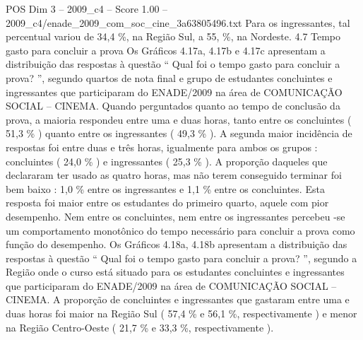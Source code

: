 \begin{textsample}{POS Dim 3 – 2009\_c4 – Score 1.00 – 2009\_c4/enade\_2009\_com\_soc\_cine\_3a63805496.txt}
Para os ingressantes, tal percentual variou de 34,4 \%, na Região Sul, a 55, \%, na Nordeste. 4.7 Tempo gasto para concluir a prova Os Gráficos 4.17a, 4.17b e 4.17c apresentam a distribuição das respostas à questão “ Qual foi o tempo gasto para concluir a prova? ”, segundo quartos de nota final e grupo de estudantes concluintes e ingressantes que participaram do ENADE/2009 na área de COMUNICAÇÃO SOCIAL – CINEMA.
Quando perguntados quanto ao tempo de conclusão da prova, a maioria respondeu entre uma e duas horas, tanto entre os concluintes ( 51,3 \% ) quanto entre os ingressantes ( 49,3 \% ).
A segunda maior incidência de respostas foi entre duas e três horas, igualmente para ambos os grupos : concluintes ( 24,0 \% ) e ingressantes ( 25,3 \% ).
A proporção daqueles que declararam ter usado as quatro horas, mas não terem conseguido terminar foi bem baixo : 1,0 \% entre os ingressantes e 1,1 \% entre os concluintes.
Esta resposta foi maior entre os estudantes do primeiro quarto, aquele com pior desempenho.
Nem entre os concluintes, nem entre os ingressantes percebeu -se um comportamento monotônico do tempo necessário para concluir a prova como função do desempenho.
Os Gráficos 4.18a, 4.18b apresentam a distribuição das respostas à questão “ Qual foi o tempo gasto para concluir a prova? ”, segundo a Região onde o curso está situado para os estudantes concluintes e ingressantes que participaram do ENADE/2009 na área de COMUNICAÇÃO SOCIAL – CINEMA.
A proporção de concluintes e ingressantes que gastaram entre uma e duas horas foi maior na Região Sul ( 57,4 \% e 56,1 \%, respectivamente ) e menor na Região Centro-Oeste ( 21,7 \% e 33,3 \%, respectivamente ).

\end{textsample}
